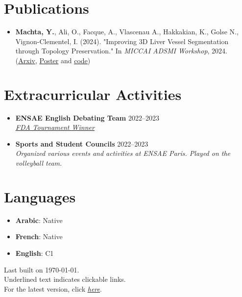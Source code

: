 \documentclass[letterpaper,11pt,twocolumn]{article}
\newcommand{\resumeItem}[1]{\item \small{#1}}
\newcommand{\resumeSubheading}[4]{
	\vspace{-2pt}\item \textbf{#1} \hfill #2 \\
	\textit{\small #3} \hfill \textit{\small #4} 
	\vspace{-7pt}
}
\begin{document}
\section{Publications}
\begin{itemize}[leftmargin=*]
	\resumeItem{\textbf{Machta, Y.}, Ali, O., Facque, A., Vlascenau A., Hakkakian, K., Golse N., Vignon-Clementel, I. (2024). "Improving 3D Liver Vessel Segmentation through Topology Preservation." In \textit{MICCAI ADSMI Workshop}, 2024. (\href{https://arxiv.org/abs/2411.15778}{\underline{Arxiv}}, \href{https://MachtaYassine.github.io/Papers/2024_ADSMI_poster.pdf}{\underline{Poster}} and \underline{\href{https://gitlab.inria.fr/simbiotx/LiverVesselSeg}{code}})}
\end{itemize}

\section{Extracurricular Activities}
\begin{itemize}[leftmargin=*]
	\resumeSubheading
	{ENSAE English Debating Team}{2022--2023}{\href{https://www.frenchdebatingassociation.fr/\#fda}{\underline{FDA Tournament Winner}} }{}
	\resumeSubheading
	{Sports and Student Councils}{2022--2023}{Organized various events and activities at ENSAE Paris. Played on the volleyball team.}{}
\end{itemize}

\section{Languages}
\begin{itemize}[leftmargin=*]
	\item \textbf{Arabic}: Native
	\item \textbf{French}: Native
	\item \textbf{English}: C1
\end{itemize}

\begin{flushright}
	\vspace{-4pt}
	\color{gray}
	Last built on \today.  \\
	Underlined text indicates clickable links. \\
	For the latest version, click \href{https://machtayassine.github.io/resume/resume_ymachta.pdf}{\underline{\textit{here}}}.
\end{flushright}
\end{document}
